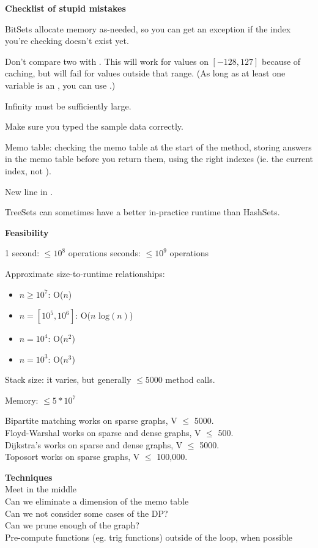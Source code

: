 
\textbf{Checklist of stupid mistakes}

BitSets allocate memory as-needed, so you can get an  exception if the index you're checking doesn't exist yet.

Don't compare two  with \inline{==}. This will work for values on $[-128, 127]$ because of caching, but will fail for values outside that range. (As long as at least one variable is an , you can use \inline{==}.)

Infinity must be sufficiently large.

Make sure you typed the sample data correctly.

Memo table: checking the memo table at the start of the method, storing answers in the memo table before you return them, using the right indexes (ie. the current index, not ).

New line in .

TreeSets can sometimes have a better in-practice runtime than HashSets.

\textbf{Feasibility}

1 second: $\leq 10^8$ operations \indent{} seconds: $\leq 10^9$ operations

Approximate size-to-runtime relationships:
\begin{itemize}
    \item $n \geq 10^7$: O($n$)
    \item $n = [10^5, 10^6]$: O($n\text{ log}(n)$)
    \item $n = 10^4$: O($n^2$)
    \item $n = 10^3$: O($n^3$)
\end{itemize}

Stack size: it varies, but generally $\leq 5000$ method calls.

Memory: $\leq 5*10^7$

Bipartite matching works on sparse graphs, V $\leq$ 5000. \\
Floyd-Warshal works on sparse and dense graphs, V $\leq$ 500. \\
Dijkstra’s works on sparse and dense graphs, V $\leq$ 5000. \\
Toposort works on sparse graphs, V $\leq$ 100,000.

\textbf{Techniques} \\ 
Meet in the middle \\
Can we eliminate a dimension of the memo table \\
Can we not consider some cases of the DP? \\
Can we prune enough of the graph? \\
Pre-compute functions (eg. trig functions) outside of the loop, when possible 

